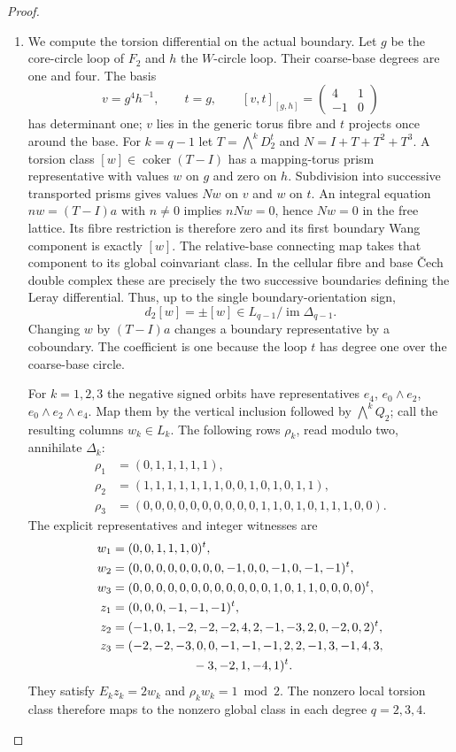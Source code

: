 \documentclass[11pt,a4paper]{article}
\theoremstyle{definition}
\begin{document}
\begin{proof}
\begin{enumerate}[label=\arabic*.]
\item We compute the torsion differential on the actual boundary.
Let $g$ be the core-circle loop of $F_2$ and $h$ the $W$-circle loop.
Their coarse-base degrees are one and four.  The basis
\[
 v=g^4h^{-1},\qquad t=g,
 \qquad [v,t]_{[g,h]}=\begin{pmatrix}4&1\\-1&0\end{pmatrix}
\]
has determinant one; $v$ lies in the generic torus fibre and $t$
projects once around the base.
For $k=q-1$ let $T=\bigwedge^kD_2^t$ and $N=I+T+T^2+T^3$.
A torsion class $[w]\in\operatorname{coker}(T-I)$ has a mapping-torus
prism representative with values $w$ on $g$ and zero on $h$.
Subdivision into successive transported prisms gives values $Nw$
on $v$ and $w$ on $t$.  An integral equation $nw=(T-I)a$ with
$n\ne0$ implies $nNw=0$, hence $Nw=0$ in the free lattice.
Its fibre restriction is therefore zero and its first boundary
Wang component is exactly $[w]$.
The relative-base connecting map takes that component to its global
coinvariant class.  In the cellular fibre and base \v{C}ech double
complex these are precisely the two successive boundaries defining
the Leray differential.  Thus, up to the single boundary-orientation
sign,
\[
 d_2[w]=\pm[w]\in L_{q-1}/\operatorname{im}\Delta_{q-1}.
 \tag{F.6}\label{maps:eq:F.6}
\]
Changing $w$ by $(T-I)a$ changes a boundary representative by a
coboundary.  The coefficient is one because the loop $t$ has degree
one over the coarse-base circle.

For $k=1,2,3$ the negative signed orbits have representatives
$e_4$, $e_0\wedge e_2$, $e_0\wedge e_2\wedge e_4$.
Map them by the vertical inclusion followed by $\bigwedge^kQ_2$;
call the resulting columns $w_k\in L_k$.
The following rows $\rho_k$, read modulo two, annihilate
$\Delta_k$:
\[
\begin{aligned}
\rho_1&=(0,1,1,1,1,1),\\
\rho_2&=(1,1,1,1,1,1,1,0,0,1,0,1,0,1,1),\\
\rho_3&=(0,0,0,0,0,0,0,0,0,0,1,1,0,1,0,1,1,1,0,0).
\end{aligned}
\]
The explicit representatives and integer witnesses are
\[
\begin{aligned}
w_1&=(0,0,1,1,1,0)^t,\\
w_2&=(0,0,0,0,0,0,0,0,-1,0,0,-1,0,-1,-1)^t,\\
w_3&=(0,0,0,0,0,0,0,0,0,0,0,0,1,0,1,1,0,0,0,0)^t,\\
z_1&=(0,0,0,-1,-1,-1)^t,\\
z_2&=(-1,0,1,-2,-2,-2,4,2,-1,-3,2,0,-2,0,2)^t,\\
z_3&=(-2,-2,-3,0,0,-1,-1,-1,2,2,-1,3,-1,4,3,\\
   &\hspace{23mm}-3,-2,1,-4,1)^t.
\end{aligned}
\]
They satisfy $E_kz_k=2w_k$ and $\rho_kw_k=1\bmod2$.
The nonzero local torsion class therefore maps to the nonzero global
class in each degree $q=2,3,4$.


\end{enumerate}
\end{proof}
\end{document}
